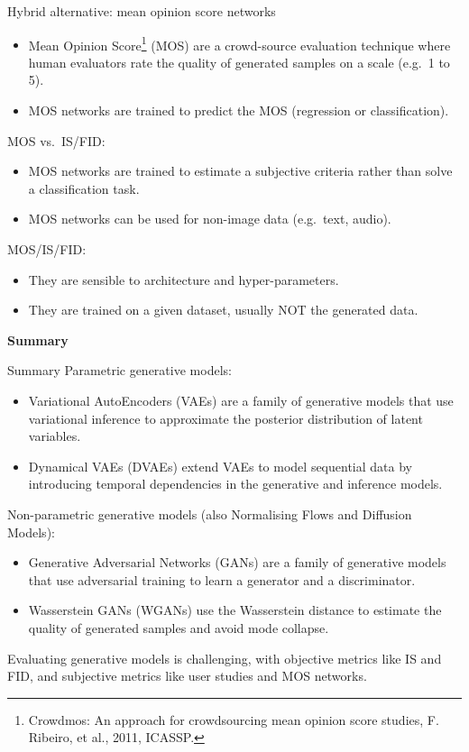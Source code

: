 \documentclass[11pt,aspectratio=169,usenames,dvipsnames]{beamer}
\begin{document}
\begin{frame}{Hybrid alternative: mean opinion score networks}
  \begin{itemize}
    \item Mean Opinion Score\footnote{Crowdmos: An approach for crowdsourcing mean opinion score studies, F. Ribeiro, et al., 2011, ICASSP.} (MOS) are a crowd-source evaluation technique where human evaluators rate the quality of generated samples on a scale (e.g.\ 1 to 5).
  \item MOS networks are trained to predict the MOS (regression or classification).
  \end{itemize}
MOS vs.\ IS/FID:
  \begin{itemize}
  \item MOS networks are trained to estimate a subjective criteria rather than solve a classification task.
  \item MOS networks can be used for non-image data (e.g.\ text, audio).
  \end{itemize}
MOS/IS/FID:
  \begin{itemize}
  \item They are sensible to architecture and hyper-parameters.
  \item They are trained on a given dataset, usually NOT the generated data.
  \end{itemize}\vspace{5mm}
\end{frame}

{
\begin{frame}
  \centering \color{white}\large\bf
  Summary
\end{frame}
}

\begin{frame}{Summary}
Parametric generative models:
  \begin{itemize}
  \item Variational AutoEncoders (VAEs) are a family of generative models that use variational inference to approximate the posterior distribution of latent variables.
  \item Dynamical VAEs (DVAEs) extend VAEs to model sequential data by introducing temporal dependencies in the generative and inference models.
  \end{itemize}
Non-parametric generative models (also Normalising Flows and Diffusion Models):
  \begin{itemize}
  \item Generative Adversarial Networks (GANs) are a family of generative models that use adversarial training to learn a generator and a discriminator.
  \item Wasserstein GANs (WGANs) use the Wasserstein distance to estimate the quality of generated samples and avoid mode collapse.
  \end{itemize}
Evaluating generative models is challenging, with objective metrics like IS and FID, and subjective metrics like user studies and MOS networks.
\end{frame}
\end{document}

